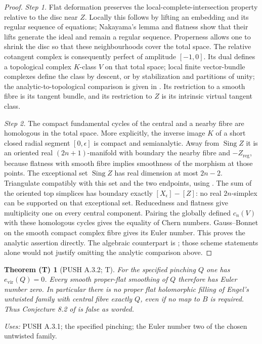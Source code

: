 \documentclass[11pt,a4paper]{article}
\theoremstyle{plain}
\newtheorem{theorem}{Theorem (T)}[section]
\theoremstyle{definition}
\begin{document}
\begin{proof}
\par\noindent\textit{Step 1.} Flat deformation preserves the local-complete-intersection
property relative to the disc near $Z$. Locally this follows by
lifting an embedding and its regular sequence of equations;
Nakayama's lemma and flatness show that their lifts generate
the ideal and remain a regular sequence. Properness allows one
to shrink the disc so that these neighbourhoods cover the total
space. The relative cotangent complex is consequently perfect
of amplitude $[-1,0]$. Its dual defines a topological complex
$K$-class $V$ on that total space; local finite vector-bundle
complexes define the class by descent, or by stabilization and
partitions of unity; the analytic-to-topological comparison is
given in \cite[Lemmas 3.1--3.2 and Section 3.1]{Levy08}.
Its restriction to a smooth fibre is its
tangent bundle, and its restriction to $Z$ is its intrinsic
virtual tangent class.

\par\noindent\textit{Step 2.} The compact fundamental cycles of the central and a nearby
fibre are homologous in the total space. More explicitly,
the inverse image $K$ of a short closed radial segment
$[0,\epsilon]$ is compact and semianalytic. Away from
$\operatorname{Sing}Z$ it is an oriented real
$(2n+1)$-manifold with boundary the nearby fibre and
$-Z_{\mathrm{reg}}$, because flatness with smooth fibre
implies smoothness of the morphism at those points.
The exceptional set $\operatorname{Sing}Z$ has real
dimension at most $2n-2$. Triangulate compatibly with
this set and the two endpoints, using
\cite[Section 3, Theorems 1--2]{Loj64}. The sum of the
oriented top simplices has boundary exactly
$[X_\epsilon]-[Z]$: no real $2n$-simplex can be supported
on that exceptional set. Reducedness and flatness give
multiplicity one on every central component. Pairing the globally defined
$c_n(V)$ with these homologous cycles gives the equality of
Chern numbers. Gauss--Bonnet on the smooth compact complex
fibre gives its Euler number. This proves the analytic assertion
directly. The algebraic counterpart is \cite[Theorem~5.8 and Remark~5.9]{FG10}; those scheme statements alone would
not justify omitting the analytic comparison above.
\end{proof}

\begin{theorem}[PUSH A.3.2; T]\label{push:A.3.2}
For the specified pinching $Q$ one has $e_{\mathrm{vir}}(Q)=0$.
Every smooth proper-flat smoothing of $Q$ therefore has Euler
number zero. In particular there is no proper flat holomorphic
filling of Engel's untwisted family with central fibre exactly
$Q$, even if no map to $B$ is required. Thus Conjecture 8.2
of \cite[Conjecture~8.2]{E26} is false as worded.
\end{theorem}
\noindent\emph{Uses:} PUSH A.3.1; the specified pinching; the Euler number two of the chosen untwisted family.\par
\end{document}
